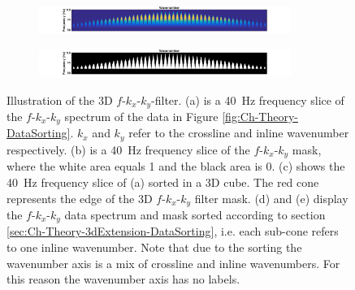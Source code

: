 \begin{figure}
	\begin{subfigure}[t]{\textwidth}
		\centering
		\includegraphics[width=0.9\textwidth]{Plots/IdealData3d/P_fkk_Delphi}
		\caption{}
		\label{fig:Ch-Theory-FK-delphi-data}
	\end{subfigure}
	\par\bigskip
	\begin{subfigure}[t]{\textwidth}
		\centering
		\includegraphics[width=0.9\textwidth]{Plots/IdealData3d/fkk-mask-Delphi}
		\caption{}
		\label{fig:Ch-Theory-FK-delphi-mask}
	\end{subfigure}
	
	\caption{Illustration of the 3D $f$-$k_x$-$k_y$-filter. (a) is a \SI{40}{\hertz} frequency slice of the $f$-$k_x$-$k_y$ spectrum of the data in Figure \ref{fig:Ch-Theory-DataSorting}. $k_x$ and $k_y$ refer to the crossline and inline wavenumber respectively. (b) is a \SI{40}{\hertz} frequency slice of the $f$-$k_x$-$k_y$ mask, where the white area equals 1 and the black area is 0. (c) shows the \SI{40}{\hertz} frequency slice of (a) sorted in a 3D cube. The red cone represents the edge of the 3D $f$-$k_x$-$k_y$ filter mask. (d) and (e) display the $f$-$k_x$-$k_y$ data spectrum and mask sorted according to section \ref{sec:Ch-Theory-3dExtension-DataSorting}, i.e. each sub-cone refers to one inline wavenumber. Note that due to the sorting the wavenumber axis is a mix of crossline and inline wavenumbers. For this reason the wavenumber axis has no labels.}
	\label{fig:Ch-Theory-FKK-Mask}

\end{figure}



